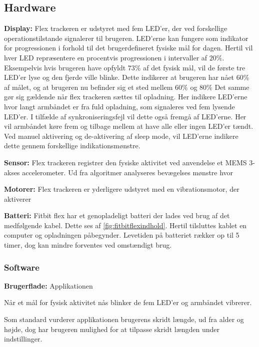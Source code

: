 \subsection{Hardware}
\textbf{Display:} 
Flex trackeren er udstyret med fem LED'er, der ved forskellige operationstilstande signalerer til brugeren. 
LED'erne kan fungere som indikator for progressionen i forhold til det brugerdefineret fysiske mål for dagen. Hertil vil hver LED repræsentere en procentvis progressionen i intervaller af $20 \%$. Eksempelvis hvis brugeren have opfyldt $73 \%$ af det fysisk mål, vil de første tre LED'er lyse og den fjerde ville blinke. Dette indikerer at brugeren har nået $60 \%$ af målet, og at brugeren nu befinder sig et sted mellem $60 \%$ og $80 \%$ 
Det samme gør sig gældende når flex trackeren sættes til opladning. Her indikere LED'erne hvor langt armbåndet er fra fuld opladning, som signaleres ved fem lysende LED'er. 
I tilfælde af synkroniseringsfejl vil dette også fremgå af LED'erne. Her vil armbåndet køre frem og tilbage mellem at have alle eller ingen LED'er tændt. 
Ved manuel aktivering og de-aktivering af sleep mode, vil LED'erne indikere dette gennem forskellige indikationsmønstre. 

\textbf{Sensor:} 
Flex trackeren registrer den fysiske aktivitet ved anvendelse et MEMS 3-akses accelerometer. Ud fra algoritmer analyseres bevægelses mønstre hvor


\textbf{Motorer:}
Flex trackeren er yderligere udstyret med en vibrationsmotor, der aktiverer 


\textbf{Batteri:} 
Fitbit flex har et genopladeligt batteri der lades ved brug af det medfølgende kabel. Dette ses af \autoref{fig:fitbitflexindhold}. Hertil tilsluttes kablet en computer og opladningen påbegynder. 
Levetiden på batteriet rækker op til 5 timer, dog kan mindre forventes ved omstændigt brug. 


\subsubsection{Software}
\textbf{Brugerflade:} %
Applikationen  

Når et mål for fysisk aktivitet nås blinker de fem LED'er og armbåndet vibrerer. 

Som standard vurderer applikationen brugerens skridt længde, ud fra alder og højde, dog har brugeren mulighed for at tilpasse skridt længden under indstillinger.  

